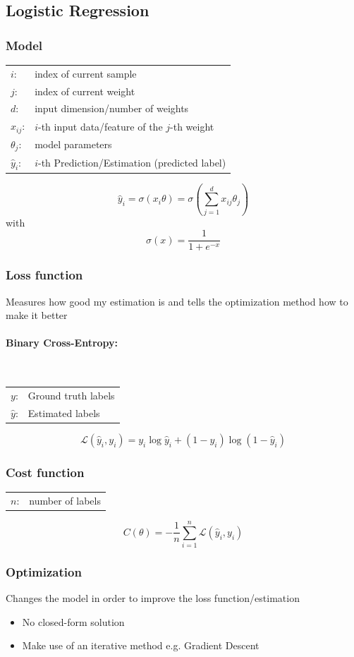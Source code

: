 \documentclass[10pt,a4paper]{article}
\begin{document}
\subsection{Logistic Regression}
\subsubsection{Model}
\begin{tabular}{ll}
	$i$: & index of current sample \\
	$j$: & index of current weight \\
	$d$: & input dimension/number of weights \\
	$x_{ij}$: & $i$-th input data/feature of the $j$-th weight \\
	$\theta_j$: & model parameters \\
	$\hat y_i$: & $i$-th Prediction/Estimation (predicted label)
\end{tabular}

$$
	\hat y_i = \sigma(x_i \theta) = \sigma \left(\sum_{j = 1}^d x_{ij} \theta_j \right)
$$
with
$$
	\sigma(x) = \frac 1 {1 + e^{-x}}
$$

\subsubsection{Loss function}
Measures how good my estimation is and tells the optimization method how to make it better

\paragraph{Binary Cross-Entropy:} ~\\
\begin{tabular}{ll}
	$y$: & Ground truth labels \\
	$\hat y$: & Estimated labels
\end{tabular}
$$
	\mathcal L(\hat y_i, y_i) = y_i \log \hat y_i + (1 - y_i) \log (1 - \hat y_i)
$$

\subsubsection{Cost function}
\begin{tabular}{ll}
	$n$: & number of labels
\end{tabular}
$$
	C(\theta) = - \frac 1 n \sum_{i = 1}^n \mathcal L(\hat y_i, y_i)
$$

\subsubsection{Optimization}
Changes the model in order to improve the loss function/estimation
\begin{itemize}
	\item No closed-form solution
	\item Make use of an iterative method e.g. Gradient Descent
\end{itemize}
\end{document}
